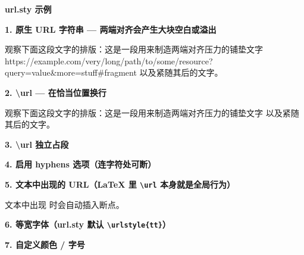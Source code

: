 \documentclass[10.5pt]{extarticle}
\begin{document}
\begin{center}\bfseries\Large url.sty 示例\end{center}

\textbf{1. 原生 URL 字符串 --- 两端对齐会产生大块空白或溢出}

观察下面这段文字的排版：这是一段用来制造两端对齐压力的铺垫文字
https://example.com/very/long/path/to/some/resource?query=value\&more=stuff\#fragment
以及紧随其后的文字。

\textbf{2. {\ttfamily\textbackslash url} --- 在恰当位置换行}

观察下面这段文字的排版：这是一段用来制造两端对齐压力的铺垫文字 \longurl{} 以及紧随其后的文字。

\textbf{3. {\ttfamily\textbackslash url} 独立占段}

\longurl

\textbf{4. 启用 hyphens 选项（连字符处可断）}

\hyphurl

\textbf{5. 文本中出现的 URL（LaTeX 里 \texttt{\textbackslash url} 本身就是全局行为）}

文本中出现 \shorturl{} 时会自动插入断点。

\textbf{6. 等宽字体（url.sty 默认 \texttt{\textbackslash urlstyle\{tt\}}）}

{\longurl}

\textbf{7. 自定义颜色 / 字号}

{\color{blue}\fontsize{9}{10.8}\selectfont\longurl}
\end{document}

